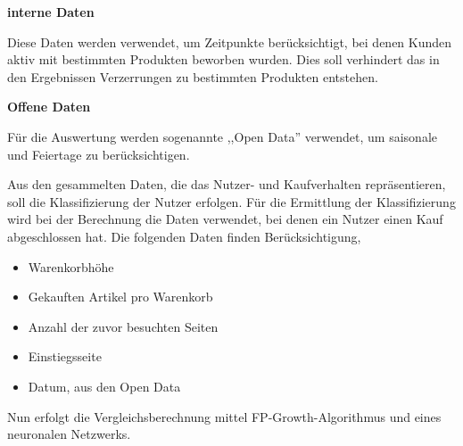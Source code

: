\textbf{interne Daten}\vspace{0.1cm}

Diese Daten werden verwendet, um Zeitpunkte berücksichtigt, bei denen Kunden aktiv mit bestimmten Produkten beworben wurden. Dies soll verhindert das in den Ergebnissen Verzerrungen zu bestimmten Produkten entstehen.\vspace{0.2cm}

\textbf{Offene Daten}\vspace{0.1cm}

Für die Auswertung werden sogenannte ,,Open Data'' verwendet, um saisonale und Feiertage zu berücksichtigen.\vspace{0.2cm}

Aus den gesammelten Daten, die das Nutzer- und Kaufverhalten repräsentieren, soll die Klassifizierung der Nutzer erfolgen. Für die Ermittlung der Klassifizierung wird bei der Berechnung die Daten verwendet, bei denen ein Nutzer einen Kauf abgeschlossen hat. Die folgenden Daten finden Berücksichtigung,
\begin{itemize}
	\item Warenkorbhöhe
	\item Gekauften Artikel pro Warenkorb
	\item Anzahl der zuvor besuchten Seiten
	\item Einstiegsseite
	\item Datum, aus den Open Data
\end{itemize}
Nun erfolgt die Vergleichsberechnung mittel FP-Growth-Algorithmus und eines neuronalen Netzwerks.
